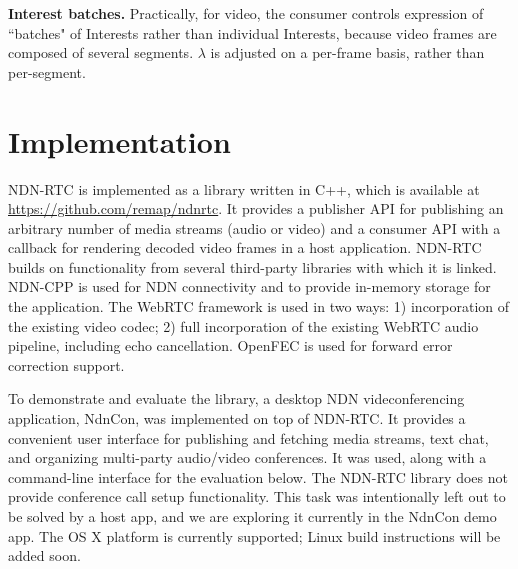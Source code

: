 \documentclass{icn/sig-alternate-2013} %
\newcommand{\ndnrtcName}{NDN-RTC} %
\newcommand{\ndnconName}{NdnCon}
\begin{document}
\textbf{Interest batches.} Practically, for video, the consumer controls expression of ``batches" of Interests rather than individual Interests, because video frames are composed of several segments.  $\lambda$ is adjusted on a per-frame basis, rather than per-segment. 

\section{Implementation}
\label{sec:imp}
\ndnrtcName{} is implemented as a library written in C++, which is available at \url{https://github.com/remap/ndnrtc}. 
It provides a publisher API for publishing an arbitrary number of media streams (audio or video) and a consumer API with a callback for rendering decoded video frames in a host application. \ndnrtcName{} builds on functionality from several third-party libraries with which it is linked. NDN-CPP \cite{ndnccl} is used for NDN connectivity and to provide in-memory storage for the application. The WebRTC framework \cite{webrtc} is used in two ways: 1) incorporation of the existing video codec; 2) full incorporation of the existing WebRTC audio pipeline, including echo cancellation. OpenFEC \cite{openfec} is used for forward error correction support. 


To demonstrate and evaluate the library, a desktop NDN videconferencing application, \ndnconName{}, \cite{ndncon} was implemented on top of \ndnrtcName{}. It provides a convenient user interface for publishing and fetching media streams, text chat, and organizing multi-party audio/video conferences. It was used, along with a command-line interface for the evaluation below.
The \ndnrtcName{} library does not provide conference call setup functionality. This task was intentionally left out to be solved by a host app, and we are exploring it currently in the \ndnconName{} demo app.  The OS X platform is currently supported; Linux build instructions will be added soon. %
\end{document}

